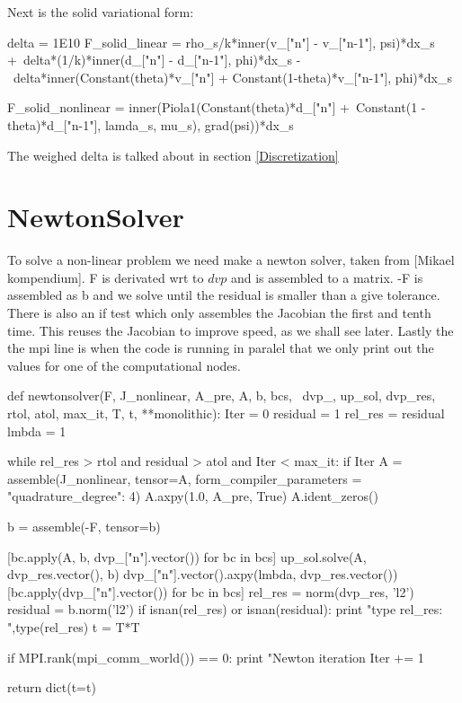 Next is the solid variational form:
\begin{python}
delta = 1E10
F_solid_linear = rho_s/k*inner(v_["n"] - v_["n-1"], psi)*dx_s +\
delta*(1/k)*inner(d_["n"] - d_["n-1"], phi)*dx_s -\
delta*inner(Constant(theta)*v_["n"] + Constant(1-theta)*v_["n-1"], phi)*dx_s

F_solid_nonlinear = inner(Piola1(Constant(theta)*d_["n"] +\
Constant(1 - theta)*d_["n-1"], lamda_s, mu_s), grad(psi))*dx_s
\end{python}

The weighed delta is talked about in section \ref{Discretization}

\section{NewtonSolver}
To solve a non-linear problem we need make a newton solver, taken from [Mikael kompendium]. F is derivated wrt to $dvp$ and is assembled to a matrix. -F is assembled as b and we solve until the residual is smaller than a give tolerance. There is also an if test which only assembles the Jacobian the first and tenth time. This reuses the Jacobian to improve speed, as we shall see later. Lastly the the mpi line is when the code is running in paralel that we only print out the values for one of the computational nodes.  
\begin{python}
def newtonsolver(F, J_nonlinear, A_pre, A, b, bcs, \
                dvp_, up_sol, dvp_res, rtol, atol, max_it, T, t, **monolithic):
    Iter      = 0
    residual   = 1
    rel_res    = residual
    lmbda = 1

    while rel_res > rtol and residual > atol and Iter < max_it:
        if Iter %
            A = assemble(J_nonlinear, tensor=A, form_compiler_parameters = {"quadrature_degree": 4})
            A.axpy(1.0, A_pre, True)
            A.ident_zeros()

        b = assemble(-F, tensor=b)

        [bc.apply(A, b, dvp_["n"].vector()) for bc in bcs]
        up_sol.solve(A, dvp_res.vector(), b)
        dvp_["n"].vector().axpy(lmbda, dvp_res.vector())
        [bc.apply(dvp_["n"].vector()) for bc in bcs]
        rel_res = norm(dvp_res, 'l2')
        residual = b.norm('l2')
        if isnan(rel_res) or isnan(residual):
            print "type rel_res: ",type(rel_res)
            t = T*T

        if MPI.rank(mpi_comm_world()) == 0:
            print "Newton iteration %
        Iter += 1

    return dict(t=t)
\end{python}


